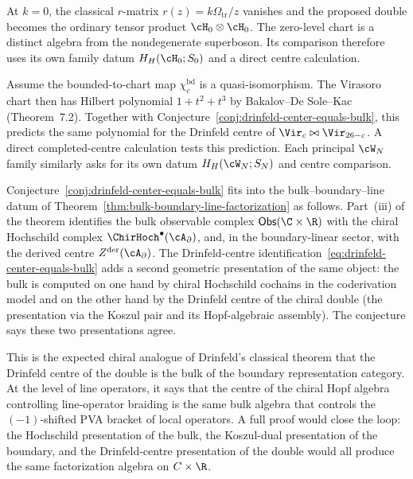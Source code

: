 \begin{remark}[Sanity check at $k=0$]
\label{rem:drinfeld-center-heisenberg-k-zero}
At $k=0$, the classical $r$-matrix $r(z)=k\Omega_{\mathrm{tr}}/z$
vanishes and the proposed double becomes the ordinary tensor product
$\cH_0\otimes\cH_0$.  The zero-level chart is a distinct algebra from
the nondegenerate superboson.  Its comparison therefore uses its own
family datum $H_H(\cH_0;S_0)$ and a direct centre calculation.
\end{remark}

\begin{remark}
\label{rem:drinfeld-center-virasoro-open}
Assume the bounded-to-chart map $\chi_c^{\mathrm{bd}}$ is a
quasi-isomorphism.  The Virasoro chart then has Hilbert polynomial
$1+t^2+t^3$ by Bakalov--De Sole--Kac
\cite{BDSK21} \textup{(}Theorem~7.2\textup{)}. Together with
Conjecture~\textup{\ref{conj:drinfeld-center-equals-bulk}}, this predicts
the same polynomial for the Drinfeld centre of
$\Vir_c\bowtie\Vir_{26-c}$.  A direct completed-centre calculation
tests this prediction.  Each principal $\cW_N$ family similarly asks
for its own datum $H_H(\cW_N;S_N)$ and centre comparison.
\end{remark}

\begin{remark}
\label{rem:drinfeld-center-bulk-boundary}
Conjecture~\textup{\ref{conj:drinfeld-center-equals-bulk}} fits into the
bulk--boundary--line datum of
Theorem~\textup{\ref{thm:bulk-boundary-line-factorization}} as follows.
Part~(iii) of the theorem identifies the bulk observable complex
$\mathsf{Obs}(\C \times \R)$ with the chiral Hochschild complex
$\ChirHoch^\bullet(\cA_\partial)$, and, in the boundary-linear sector,
with the derived centre $Z^{\mathrm{der}}(\cA_\partial)$. The
Drinfeld-centre identification~\eqref{eq:drinfeld-center-equals-bulk}
adds a second geometric presentation of the same object: the bulk is
computed on one hand by chiral Hochschild cochains in the coderivation
model and on the other hand by the
Drinfeld centre of the chiral double (the presentation via the Koszul
pair and its Hopf-algebraic assembly). The conjecture says these two
presentations agree.

This is the expected chiral analogue of Drinfeld's classical theorem
that the Drinfeld centre of the double is the bulk of the boundary
representation category. At the level of line operators, it says that
the centre of the chiral Hopf algebra controlling line-operator braiding
is the same bulk algebra that controls the $(-1)$-shifted PVA bracket of
local operators. A full proof would close the loop: the Hochschild
presentation of the bulk, the Koszul-dual presentation of the boundary,
and the Drinfeld-centre presentation of the double would all produce
the same factorization algebra on $C \times \R$.
\end{remark}

